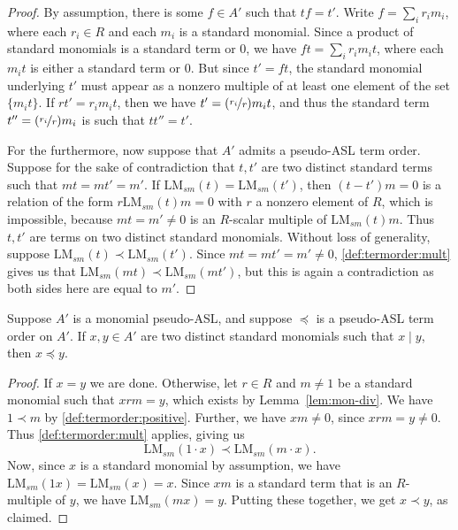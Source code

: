 \documentclass[11pt,reqno]{amsart}
\newcommand{\divides}{\mid}
\newcommand{\lmsm}{\text{LM}_{sm}}
\theoremstyle{definition}
\numberwithin{equation}{section}
\begin{document}
\begin{proof}
By assumption, there is some $f \in A'$ such that $tf=t'$. Write $f = \sum_i r_i m_i$, where each $r_i \in R$ and each $m_i$ is a standard monomial. Since a product of standard monomials is a standard term or 0, we have $ft = \sum_i r_i m_i t$, where each $m_i t$ is either a standard term or 0. But since $t'=ft$, the standard monomial underlying $t'$ must appear as a nonzero multiple of at least one element of the set $\{m_i t\}$. If $r t' = r_i m_i t$, then we have $t' = (\nicefrac{r_i}{r}) m_i t$, and thus the standard term $t'' = (\nicefrac{r_i}{r}) m_i$ is such that $tt'' = t'$.

For the furthermore, now suppose that $A'$ admits a pseudo-ASL term order. Suppose for the sake of contradiction that $t,t'$ are two distinct standard terms such that $mt = mt' = m'$. If $\lmsm(t) = \lmsm(t')$, then $(t-t')m = 0$ is a relation of the form $r\lmsm(t) m = 0$ with $r$ a nonzero element of $R$, which is impossible, because $mt = m' \neq 0$ is an $R$-scalar multiple of $\lmsm(t) m$. Thus $t,t'$ are terms on two distinct standard monomials. Without loss of generality, suppose $\lmsm(t) \prec \lmsm(t')$. Since $mt = mt' = m' \neq 0$, \ref{def:termorder:mult} gives us that $\lmsm(mt) \prec \lmsm(mt')$, but this is again a contradiction as both sides here are equal to $m'$. 
\end{proof}

\begin{lemma} \label{lem:div}
Suppose $A'$ is a monomial pseudo-ASL, and suppose $\preceq$ is a pseudo-ASL term order on $A'$. If $x,y \in A'$ are two distinct standard monomials such that $x \divides y$, then $x \preceq y$.
\end{lemma}

\begin{proof}
If $x = y$ we are done. Otherwise, let $r \in R$ and $m \neq 1$ be a standard monomial such that $xrm= y$, which exists by Lemma~\ref{lem:mon-div}. We have $1 \prec m$ by \ref{def:termorder:positive}. Further, we have $xm \neq 0$, since $xrm = y \neq 0$. Thus \ref{def:termorder:mult} applies, giving us 
\[
\lmsm(1 \cdot x) \prec \lmsm(m \cdot x). 
\]
Now, since $x$ is a standard monomial by assumption, we have $\lmsm(1x) = \lmsm(x) = x$. Since $xm$ is a standard term that is an $R$-multiple of $y$, we have $\lmsm(mx) = y$. Putting these together, we get $x \prec y$, as claimed.
\end{proof}
\end{document}
